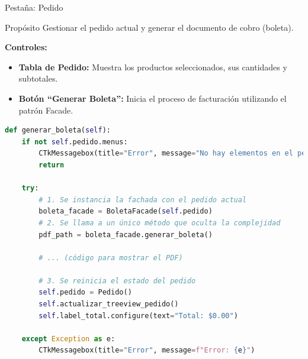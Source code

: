 \documentclass[12pt]{beamer}
\begin{document}
\begin{frame}{Pestaña: Pedido}
  \begin{block}{Propósito}
    Gestionar el pedido actual y generar el documento de cobro (boleta).
  \end{block}

  \textbf{Controles:}
  \begin{itemize}
    \item \textbf{Tabla de Pedido:} Muestra los productos seleccionados, sus cantidades y subtotales.
    \item \textbf{Botón ``Generar Boleta'':} Inicia el proceso de facturación utilizando el patrón Facade.
  \end{itemize}

  \begin{lstlisting}[language=Python, caption={Uso del patrón Facade para generar la boleta}]
def generar_boleta(self):
    if not self.pedido.menus:
        CTkMessagebox(title="Error", message="No hay elementos en el pedido.")
        return

    try:
        # 1. Se instancia la fachada con el pedido actual
        boleta_facade = BoletaFacade(self.pedido)
        # 2. Se llama a un único método que oculta la complejidad
        pdf_path = boleta_facade.generar_boleta()
        
        # ... (código para mostrar el PDF)

        # 3. Se reinicia el estado del pedido
        self.pedido = Pedido()
        self.actualizar_treeview_pedido()
        self.label_total.configure(text="Total: $0.00")

    except Exception as e:
        CTkMessagebox(title="Error", message=f"Error: {e}")
  \end{lstlisting}
\end{frame}
\end{document}
